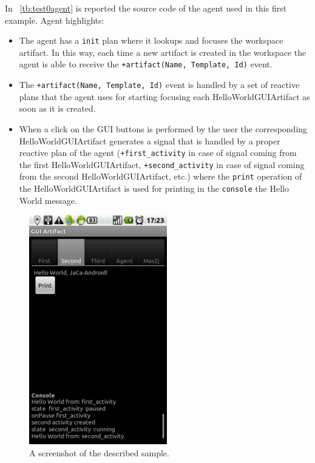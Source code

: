 \documentclass[11pt]{report}
\newcommand\xt[1]{\tablename~\ref{tb:#1}}
\newcommand\code[1]{{\mbox{\texttt{{#1}}}}}
\begin{document}
In \xt{test0agent} is reported the source code of the agent used in this first example.
%
Agent highlights:
\begin{itemize}
%	
\item The agent has a \code{init} plan where it lookups and focuses the workspace artifact. In this way, each time a new artifact is created in the workspace the agent is able to receive the \code{+artifact(Name, Template, Id)} event.
%	
\item The \code{+artifact(Name, Template, Id)} event is handled by a set of reactive plans that the agent uses for starting focusing each	\textsf{HelloWorldGUIArtifact} as soon as it is created.
%	
\item When a click on the GUI buttons is performed by the user the corresponding \textsf{HelloWorldGUIArtifact} generates a signal that is handled by a proper reactive plan of the agent (\code{+first\_activity} in case of signal coming from the first \textsf{HelloWorldGUIArtifact}, \code{+second\_activity} in case of signal coming from the second \textsf{HelloWorldGUIArtifact}, etc.) where the \code{print} operation of the \textsf{HelloWorldGUIArtifact} is used for printing in the \code{console} the Hello World message.
\end{itemize}


\begin{figure}[!ht]
\begin{center}
\includegraphics[width=6cm]{images/test_gui_gui.png}
\end{center}
\caption{A screenshot of the described sample.}
\end{figure}
\end{document}
